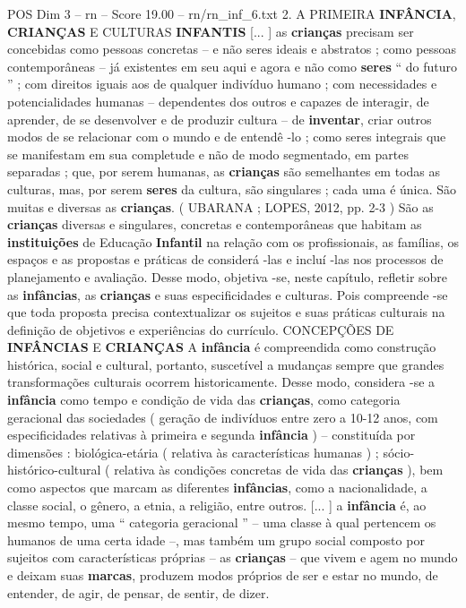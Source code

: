\begin{textsample}{POS Dim 3 – rn – Score 19.00 – rn/rn\_inf\_6.txt}  \label{ex:f3_pos_098}
2.
A PRIMEIRA \textbf{INFÂNCIA}, \textbf{CRIANÇAS} E CULTURAS \textbf{INFANTIS} [... ] as \textbf{crianças} precisam ser concebidas como pessoas concretas – e não seres ideais e abstratos ; como pessoas contemporâneas – já existentes em seu aqui e agora e não como \textbf{seres} “ do futuro ” ; com direitos iguais aos de qualquer indivíduo humano ; com necessidades e potencialidades humanas – dependentes dos outros e capazes de interagir, de aprender, de se desenvolver e de produzir cultura – de \textbf{inventar}, criar outros modos de se relacionar com o mundo e de entendê -lo ; como seres integrais que se manifestam em sua completude e não de modo segmentado, em partes separadas ; que, por serem humanas, as \textbf{crianças} são semelhantes em todas as culturas, mas, por serem \textbf{seres} da cultura, são singulares ; cada uma é única.
São muitas e diversas as \textbf{crianças}. ( UBARANA ; LOPES, 2012, pp. 2-3 ) São as \textbf{crianças} diversas e singulares, concretas e contemporâneas que habitam as \textbf{instituições} de Educação \textbf{Infantil} na relação com os profissionais, as famílias, os espaços e as propostas e práticas de considerá -las e incluí -las nos processos de planejamento e avaliação.
Desse modo, objetiva -se, neste capítulo, refletir sobre as \textbf{infâncias}, as \textbf{crianças} e suas especificidades e culturas.
Pois compreende -se que toda proposta precisa contextualizar os sujeitos e suas práticas culturais na definição de objetivos e experiências do currículo.
CONCEPÇÕES DE \textbf{INFÂNCIAS} E \textbf{CRIANÇAS} A \textbf{infância} é compreendida como construção histórica, social e cultural, portanto, suscetível a mudanças sempre que grandes transformações culturais ocorrem historicamente.
Desse modo, considera -se a \textbf{infância} como tempo e condição de vida das \textbf{crianças}, como categoria geracional das sociedades ( geração de indivíduos entre zero a 10-12 anos, com especificidades relativas à primeira e segunda \textbf{infância} ) – constituída por dimensões : biológica-etária ( relativa às características humanas ) ; sócio-histórico-cultural ( relativa às condições concretas de vida das \textbf{crianças} ), bem como aspectos que marcam as diferentes \textbf{infâncias}, como a nacionalidade, a classe social, o gênero, a etnia, a religião, entre outros. [... ] a \textbf{infância} é, ao mesmo tempo, uma “ categoria geracional ” – uma classe à qual pertencem os humanos de uma certa idade –, mas também um grupo social composto por sujeitos com características próprias – as \textbf{crianças} – que vivem e agem no mundo e deixam suas \textbf{marcas}, produzem modos próprios de ser e estar no mundo, de entender, de agir, de pensar, de sentir, de dizer.

\end{textsample}
